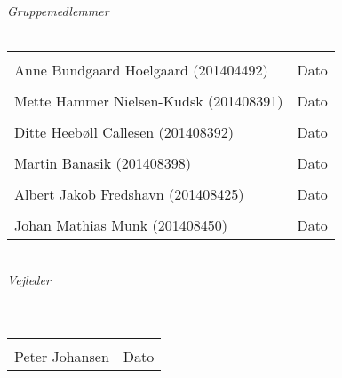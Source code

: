 \begin{vplace}[0.6]
{\large \textit{Gruppemedlemmer}}
\\
\\

\noindent \begin{tabular}{ll}
	\makebox[3in]{\hrulefill} & \makebox[1.5in]{\hrulefill}\\
	Anne Bundgaard Hoelgaard (201404492) & Dato\\[7ex]
	\makebox[3in]{\hrulefill} & \makebox[1.5in]{\hrulefill}\\
	Mette Hammer Nielsen-Kudsk  (201408391) & Dato\\[7ex]
	\makebox[3in]{\hrulefill} & \makebox[1.5in]{\hrulefill}\\
	Ditte Heebøll Callesen (201408392) & Dato\\[7ex]
	\makebox[3in]{\hrulefill} & \makebox[1.5in]{\hrulefill}\\
	Martin Banasik  (201408398) & Dato\\[7ex]
	\makebox[3in]{\hrulefill} & \makebox[1.5in]{\hrulefill}\\
	Albert Jakob Fredshavn (201408425) & Dato\\[7ex]
	\makebox[3in]{\hrulefill} & \makebox[1.5in]{\hrulefill}\\
	Johan Mathias Munk  (201408450) & Dato\\[7ex]
	
	
	
\end{tabular}
\\
{\large \textit{Vejleder}}
\\
\\
\\
\noindent \begin{tabular}{ll}
	\makebox[3.0in]{\hrulefill} & \makebox[1.5in]{\hrulefill}\\
	Peter Johansen & Dato\\[8ex]
\end{tabular}
\end{vplace}